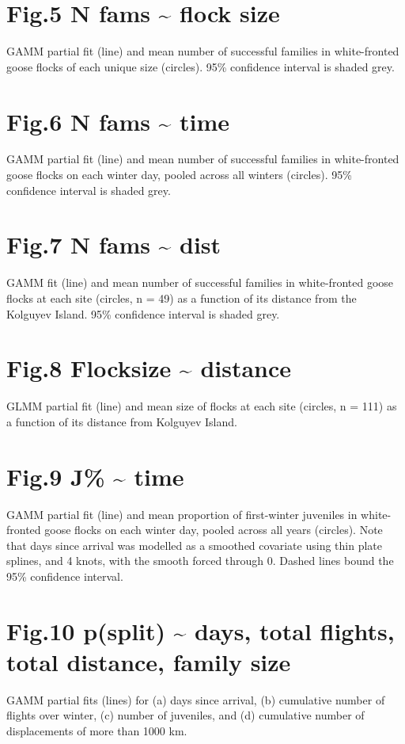 \documentclass[]{article}
\begin{document}
\section{Fig.5 N fams \textasciitilde{} flock
size}\label{fig.5-n-fams-flock-size}

GAMM partial fit (line) and mean number of successful families in
white-fronted goose flocks of each unique size (circles). 95\%
confidence interval is shaded grey.

\section{Fig.6 N fams \textasciitilde{} time}\label{fig.6-n-fams-time}

GAMM partial fit (line) and mean number of successful families in
white-fronted goose flocks on each winter day, pooled across all winters
(circles). 95\% confidence interval is shaded grey.

\section{Fig.7 N fams \textasciitilde{} dist}\label{fig.7-n-fams-dist}

GAMM fit (line) and mean number of successful families in
white-fronted goose flocks at each site (circles, n = 49) as a function
of its distance from the Kolguyev Island. 95\% confidence interval is
shaded grey.

\section{Fig.8 Flocksize \textasciitilde{}
distance}\label{fig.8-flocksize-distance}

GLMM partial fit (line) and mean size of flocks at each site (circles, n
= 111) as a function of its distance from Kolguyev Island.

\section{Fig.9 J\% \textasciitilde{} time}\label{fig.9-j-time}

GAMM partial fit (line) and mean proportion of first-winter juveniles in
white-fronted goose flocks on each winter day, pooled across all years
(circles). Note that days since arrival was modelled as a smoothed
covariate using thin plate splines, and 4 knots, with the smooth forced
through 0. Dashed lines bound the 95\% confidence interval.

\section{Fig.10 p(split) \textasciitilde{} days, total flights, total
distance, family
size}\label{fig.10-psplit-days-total-flights-total-distance-family-size}

GAMM partial fits (lines) for (a) days since arrival, (b) cumulative
number of flights over winter, (c) number of juveniles, and (d)
cumulative number of displacements of more than 1000 km.
\end{document}
